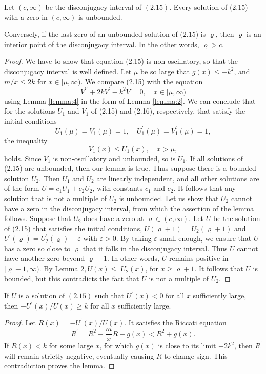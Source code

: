 \begin{lemma}\label{lemma:6}
  Let $(c, \infty)$ be the disconjugacy interval of $(2.15)$. Every solution of (2.15) with a zero in $(c, \infty)$ is unbounded.
  
  Conversely, if the last zero of an unbounded solution of (2.15) is $\varrho$, then $\varrho$ is an interior point of the disconjugacy interval. In the other words, $\varrho>c$.
\end{lemma}

\begin{proof}
  We have to show that equation (2.15) is non-oscillatory, so that the disconjugacy interval is well defined. Let $\mu$ be so large that $g(x) \leq-k^2$, and $m / x \leq 2 k$ for $x \in[\mu, \infty)$. We compare (2.15) with the equation
  \[
  V^{\prime \prime}+2 k V^{\prime}-k^2 V=0, \quad x \in[\mu, \infty)
  \]
  using Lemma \ref{lemma:4} in the form of Lemma \ref{lemma:2}. We can conclude that for the solutions $U_1$ and $V_1$ of (2.15) and (2.16), respectively, that satisfy the initial conditions
  \[
  U_1(\mu)=V_1(\mu)=1, \quad U_1^{\prime}(\mu)=V_1^{\prime}(\mu)=1,
  \]
  the inequality
  \[
  V_1(x) \leq U_1(x), \quad x>\mu,
  \]
  holds. Since $V_1$ is non-oscillatory and unbounded, so is $U_1$. If all solutions of (2.15) are unbounded, then our lemma is true. Thus suppose there is a bounded solution $U_2$. Then $U_1$ and $U_2$ are linearly independent, and all other solutions are of the form $U=c_1 U_1+c_2 U_2$, with constants $c_1$ and $c_2$. It follows that any solution that is not a multiple of $U_2$ is unbounded. Let us show that $U_2$ cannot have a zero in the disconjugacy interval, from which the assertion of the lemma follows. Suppose that $U_2$ does have a zero at $\varrho \in(c, \infty)$. Let $U$ be the solution of (2.15) that satisfies the initial conditions, $U(\varrho+1)=U_2(\varrho+1)$ and $U^{\prime}(\varrho)=U_2^{\prime}(\varrho)-\varepsilon$ with $\varepsilon>0$. By taking $\varepsilon$ small enough, we ensure that $U$ has a zero so close to $\varrho$ that it falls in the disconjugacy interval. Thus $U$ cannot have another zero beyond $\varrho+1$. In other words, $U$ remains positive in $[\varrho+1, \infty)$. By Lemma $2, U(x) \leq$ $U_2(x)$, for $x \geq \varrho+1$. It follows that $U$ is bounded, but this contradicts the fact that $U$ is not a multiple of $U_2$.
\end{proof}

\begin{lemma}\label{lemma:7}
  If $U$ is a solution of $(2.15)$ such that $U^{\prime}(x)<0$ for all $x$ sufficiently large, then $-U^{\prime}(x) / U(x) \geq k$ for all $x$ sufficiently large.
\end{lemma}

\begin{proof}
  Let $R(x)=-U^{\prime}(x) / U(x)$. It satisfies the Riccati equation
  \[
  R^{\prime}=R^2-\frac{m}{x} R+g(x)<R^2+g(x) .
  \]
  If $R(x)<k$ for some large $x$, for which $g(x)$ is close to its limit $-2 k^2$, then $R^{\prime}$ will remain strictly negative, eventually causing $R$ to change sign. This contradiction proves the lemma.
\end{proof}